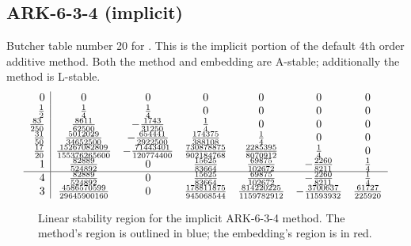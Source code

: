 \documentclass[letterpaper,10pt,english]{sphinxmanual}
\begin{document}
\subsection{ARK-6-3-4 (implicit)}
\label{Butcher:ark-6-3-4-implicit}\label{Butcher:butcher-ark-6-3-4-i}
Butcher table number 20
for {\hyperref[c_interface/User_callable:c.ARKodeSetIRKTableNum]{\emph{}}}.  This is
the implicit portion of the default 4th order additive method.  Both
the method and embedding are A-stable; additionally the method is
L-stable.
\begin{gather}
\begin{split}\begin{array}{r|cccccc}
  0 & 0 & 0 & 0 & 0 & 0 & 0 \\
  \frac{1}{2} & \frac{1}{4} & \frac{1}{4} & 0 & 0 & 0 & 0 \\
  \frac{83}{250} & \frac{8611}{62500} & -\frac{1743}{31250} & \frac{1}{4} & 0 & 0 & 0 \\
  \frac{31}{50} & \frac{5012029}{34652500} & -\frac{654441}{2922500} & \frac{174375}{388108} & \frac{1}{4} & 0 & 0 \\
  \frac{17}{20} & \frac{15267082809}{155376265600} & -\frac{71443401}{120774400} & \frac{730878875}{902184768} & \frac{2285395}{8070912} & \frac{1}{4} & 0 \\
  1 & \frac{82889}{524892} & 0 & \frac{15625}{83664} & \frac{69875}{102672} & -\frac{2260}{8211} & \frac{1}{4} \\
  \hline
  4 & \frac{82889}{524892} & 0 & \frac{15625}{83664} & \frac{69875}{102672} & -\frac{2260}{8211} & \frac{1}{4} \\
  3 & \frac{4586570599}{29645900160} & 0 & \frac{178811875}{945068544} & \frac{814220225}{1159782912} & -\frac{3700637}{11593932} & \frac{61727}{225920}
\end{array}\end{split}\notag
\end{gather}\begin{figure}[htbp]
\centering
\capstart

\caption{Linear stability region for the implicit ARK-6-3-4 method.  The method's
region is outlined in blue; the embedding's region is in red.}\end{figure}
\end{document}
